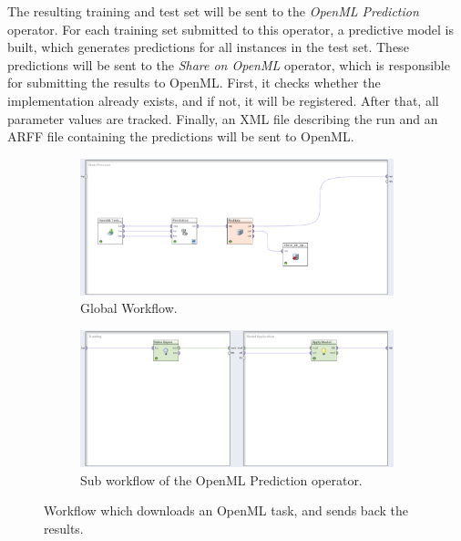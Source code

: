 \documentclass[10pt, twoside]{article}
\begin{document}
The resulting training and test set will be sent to the \emph{OpenML Prediction} operator. For each training set submitted to this operator, a predictive model is built, which generates predictions for all instances in the test set. These predictions will be sent to the \emph{Share on OpenML} operator, which is responsible for submitting the results to OpenML. First, it checks whether the implementation already exists, and if not, it will be registered. After that, all parameter values are tracked. Finally, an XML file describing the run and an ARFF file containing the predictions will be sent to OpenML.

\begin{figure}
	\begin{subfigure}{\textwidth}
		\centering
		\includegraphics[width=\textwidth]{eps/RapidMinerWorkflow.eps}
		\caption{Global Workflow.}
		\label{fig:globalWorkflow}
	\end{subfigure}
	\begin{subfigure}{\textwidth}
		\centering
		\includegraphics[width=\textwidth]{eps/RapidMinerPrediction.eps}
		\caption{Sub workflow of the OpenML Prediction operator.}
		\label{fig:subWorkflow}
	\end{subfigure}
	\caption{Workflow which downloads an OpenML task, and sends back the results.}
	\label{fig:exampleWorkflow}
\end{figure}
\end{document}
